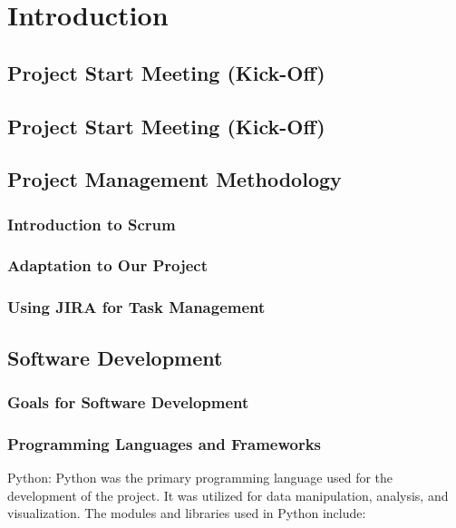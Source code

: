 \section{Introduction}
\subsection{Project Start Meeting (Kick-Off)}

\subsection{Project Start Meeting (Kick-Off)}
\subsection{Project Management Methodology}
\subsubsection{Introduction to Scrum}
\subsubsection{Adaptation to Our Project}
\subsubsection{Using JIRA for Task Management}
\subsection{Software Development}
\subsubsection{Goals for Software Development}
\subsubsection {Programming Languages and Frameworks}

Python: Python was the primary programming language used for the development of the project. It was utilized for data manipulation, analysis, and visualization. The modules and libraries used in Python include:

